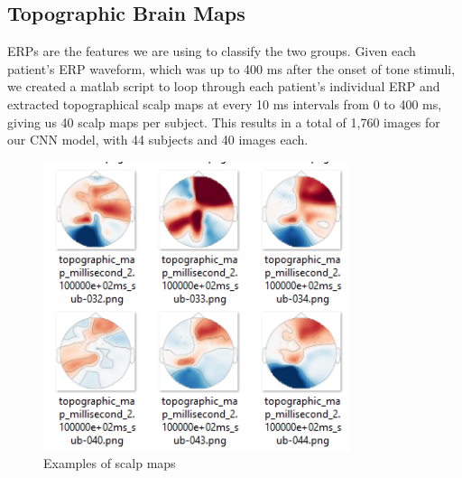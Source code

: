 \documentclass{article}
\begin{document}
\subsection{Topographic Brain Maps}
ERPs are the features we are using to classify the two groups. Given each patient's ERP waveform, which was up to 400 ms after the onset of tone stimuli, we created a matlab script to loop through each patient's individual ERP and extracted topographical scalp maps at every 10 ms intervals from 0 to 400 ms, giving us 40 scalp maps per subject. This results in a total of 1,760 images for our CNN model, with 44 subjects and 40 images each.
\begin{figure}[H]
  \centering
  \includegraphics[width=0.8\textwidth]{scalpmaps.png} %
  \caption{Examples of scalp maps} %
\end{figure}
\end{document}
